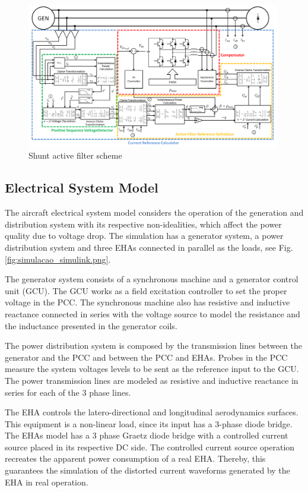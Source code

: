 \begin{figure}[!tb] %
	\centering
	\includegraphics[width=0.99\textwidth]{Figures/filtro_blocos_1.png}
	\caption{Shunt active filter scheme}
	\label{fig:filtro_blocos_1.png}
\end{figure}

\subsection{Electrical System Model}

The aircraft electrical system model considers the operation of the generation and distribution system with its respective non-idealities, which affect the power quality due to voltage drop. The simulation has a generator system, a power distribution system and three EHAs connected in parallel as the loads, see Fig. \ref{fig:simulacao_simulink.png}.

The generator system consists of a synchronous machine and a generator control unit (GCU). The GCU works as a field excitation controller to set the proper voltage in the PCC. The synchronous machine also has resistive and inductive reactance connected in series with the voltage source to model the resistance and the inductance presented in the generator coils.

The power distribution system is composed by the transmission lines between the generator and the PCC and between the PCC and EHAs. Probes in the PCC measure the system voltages levels to be sent as the reference input to the GCU. The power transmission lines are modeled as resistive and inductive reactance in series for each of the 3 phase lines.

The EHA controls the latero-directional and longitudinal aerodynamics surfaces. This equipment is a non-linear load, since its input has a 3-phase diode bridge. The EHAs model has a 3 phase Graetz diode bridge with a controlled current source placed in its respective DC side. The controlled current source operation recreates the apparent power consumption of a real EHA. Thereby, this guarantees the simulation of the distorted current waveforms generated by the EHA in real operation.

